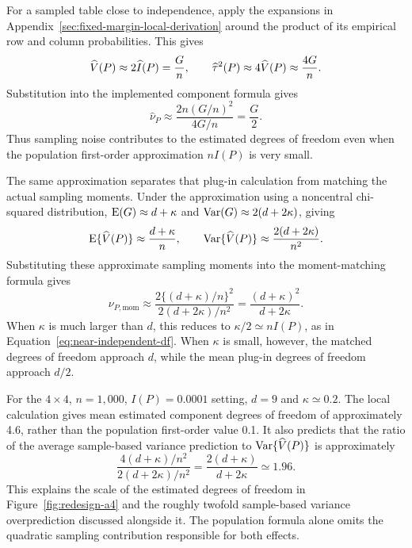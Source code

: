 For a sampled table close to independence, apply the expansions in
Appendix~\ref{sec:fixed-margin-local-derivation} around the product of its
empirical row and column probabilities. This gives
\begin{equation}
 \widehat V(P)\approx2\widehat I(P)=\frac{G}{n},
 \qquad \widehat\tau^2(P)\approx4\widehat V(P)\approx\frac{4G}{n}.
 \label{eq:small-mi-plugin-moments}
\end{equation}
Substitution into the implemented component formula gives
\begin{equation}
 \widehat\nu_P
 \approx\frac{2n(G/n)^2}{4G/n}=\frac{G}{2}.
 \label{eq:small-mi-plugin-df}
\end{equation}
Thus sampling noise contributes to the estimated degrees of freedom even
when the population first-order approximation \(nI(P)\) is very small.

The same approximation separates that plug-in calculation from matching
the actual sampling moments. Under the approximation using a noncentral
chi-squared distribution, \(\operatorname{E}(G)\approx d+\kappa\) and
\(\operatorname{Var}(G)\approx2(d+2\kappa)\), giving
\begin{equation}
 \operatorname{E}\{\widehat V(P)\}\approx\frac{d+\kappa}{n},
 \qquad
 \operatorname{Var}\{\widehat V(P)\}\approx\frac{2(d+2\kappa)}{n^2}.
\end{equation}
Substituting these approximate sampling moments into the moment-matching
formula gives
\begin{equation}
 \nu_{P,\mathrm{mom}}
 \approx
 \frac{2\{(d+\kappa)/n\}^2}{2(d+2\kappa)/n^2}
 =\frac{(d+\kappa)^2}{d+2\kappa}.
 \label{eq:small-mi-moment-df}
\end{equation}
When \(\kappa\) is much larger than \(d\), this reduces to
\(\kappa/2\simeq nI(P)\), as in
Equation~\eqref{eq:near-independent-df}. When \(\kappa\) is small,
however, the matched degrees of freedom approach \(d\), while the mean
plug-in degrees of freedom approach \(d/2\).

For the \(4\times4\), \(n=1{,}000\), \(I(P)=0.0001\) setting,
\(d=9\) and \(\kappa\simeq0.2\). The local calculation gives mean
estimated component degrees of freedom of approximately 4.6, rather than
the population first-order value 0.1. It also predicts that the ratio of
the average sample-based variance prediction to
\(\operatorname{Var}\{\widehat V(P)\}\) is approximately
\begin{equation}
 \frac{4(d+\kappa)/n^2}{2(d+2\kappa)/n^2}
 =\frac{2(d+\kappa)}{d+2\kappa}\simeq1.96.
\end{equation}
This explains the scale of the estimated degrees of freedom in
Figure~\ref{fig:redesign-a4} and the roughly twofold sample-based
variance overprediction discussed alongside it.
The population formula alone omits the quadratic sampling contribution
responsible for both effects.

